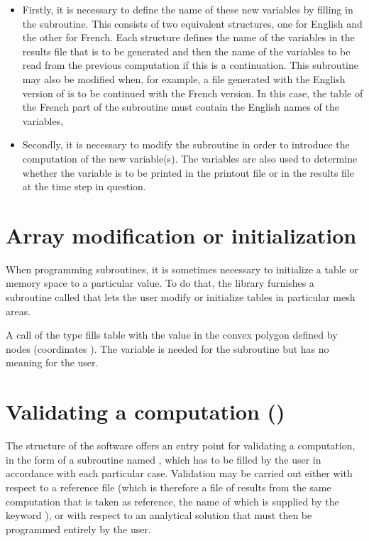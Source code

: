 \begin{itemize}
\item Firstly, it is necessary to define the name of these new variables
by filling in the  subroutine.
This consists of two equivalent structures, one for English and the other for
French.
Each structure defines the name of the variables in the results file
that is to be generated and then the name of the variables to be read
from the previous computation if this is a continuation.
This subroutine may also be modified when, for example, a file generated with
the English version of  is to be continued with the French version.
In this case, the  table of the French part of the subroutine
must contain the English names of the variables,

\item Secondly, it is necessary to modify the 
subroutine in order to introduce the computation of the new variable(s).
The variables  are also used to determine
whether the variable is to be printed in the printout file
or in the results file at the time step in question.
\end{itemize}


\section{Array modification or initialization}

When programming  subroutines, it is sometimes necessary to
initialize a table or memory space to a particular value.
To do that, the \bief library furnishes a subroutine called 
that lets the user modify or initialize tables in particular mesh areas.

A call of the type 
fills table  with the  value in the convex polygon
defined by  nodes (coordinates ).
The variable  is needed for the  subroutine
but has no meaning for the user.


\section{Validating a computation ()}

The structure of the  software offers an entry point for validating
a computation, in the form of a subroutine named ,
which has to be filled by the user in accordance with each particular case.
Validation may be carried out either with respect to a reference file
(which is therefore a file of results from the same computation that is taken
as reference, the name of which is supplied by the keyword
), or with respect to an analytical solution that must
then be programmed entirely by the user.

